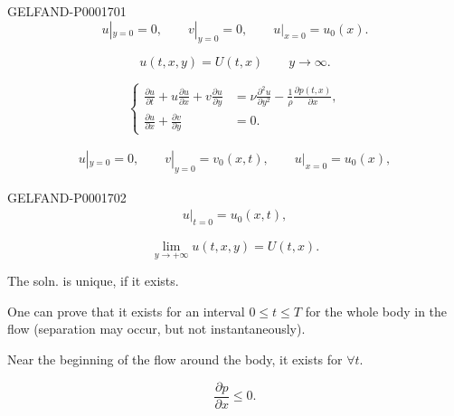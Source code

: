 \begin{GelfandAdjacentEvidence}{GELFAND-P000170}{1}
\begin{equation*}
u|_{y=0}=0,\qquad v|_{y=0}=0,\qquad u|_{x=0}=u_0(x).
\end{equation*}
\end{GelfandAdjacentEvidence}

\begin{equation*}u (t, x, y)=U (t, x)\qquad y\longrightarrow\infty.\end{equation*}


\begin{equation*}
\left\{\begin{aligned}
\frac{\partial u}{\partial t}+u\frac{\partial u}{\partial x}+v\frac{\partial u}{\partial y}&=\nu\frac{\partial^2u}{\partial y^2}-\frac1\rho\frac{\partial p (t, x)}{\partial x},\\
\frac{\partial u}{\partial x}+\frac{\partial v}{\partial y}&=0.
\end{aligned}\right.
\end{equation*}

\begin{gather*}
u|_{y=0}=0,\qquad v|_{y=0}=v_0(x, t),\qquad u|_{x=0}=u_0(x),
\end{gather*}

\begin{GelfandAdjacentEvidence}{GELFAND-P000170}{2}
\begin{gather*}
u|_{t=0}=u_0(x, t),
\end{gather*}
\end{GelfandAdjacentEvidence}

\begin{equation*}
\lim_{y\to+\infty}u (t, x, y)=U (t, x).
\end{equation*}


The soln. is unique, if it exists.

One can prove that it exists for an interval $0\le t\le T$ for the whole
body in the flow (separation may occur, but not instantaneously).

Near the beginning of the flow around the body, it exists for $\forall t$.

\begin{equation*}\frac{\partial p}{\partial x}\le0.\end{equation*}

